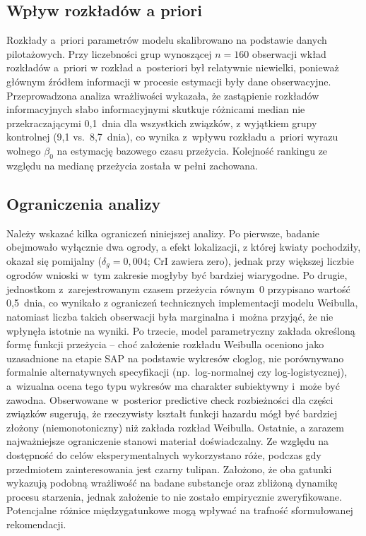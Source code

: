 \documentclass[12pt, a4paper]{article}
\begin{document}
\subsection{Wpływ rozkładów a priori}

Rozkłady a~priori parametrów modelu skalibrowano na podstawie danych pilotażowych. Przy liczebności grup wynoszącej $n = 160$ obserwacji wkład rozkładów a~priori w rozkład a~posteriori był relatywnie niewielki, ponieważ głównym źródłem informacji w procesie estymacji były dane obserwacyjne. Przeprowadzona analiza wrażliwości wykazała, że zastąpienie rozkładów informacyjnych słabo informacyjnymi skutkuje różnicami median nie przekraczającymi 0,1~dnia dla wszystkich związków, z wyjątkiem grupy kontrolnej (9,1 vs.~8,7~dnia), co wynika z~wpływu rozkładu a~priori wyrazu wolnego $\beta_0$ na estymację bazowego czasu przeżycia. Kolejność rankingu ze względu na medianę przeżycia została w pełni zachowana.

\subsection{Ograniczenia analizy}

Należy wskazać kilka ograniczeń niniejszej analizy. Po pierwsze, badanie obejmowało wyłącznie dwa ogrody, a efekt lokalizacji, z której kwiaty pochodziły, okazał się pomijalny ($\delta_g = 0{,}004$; CrI zawiera zero), jednak przy większej liczbie ogrodów wnioski w~tym zakresie mogłyby być bardziej wiarygodne. Po drugie, jednostkom z~zarejestrowanym czasem przeżycia równym~0 przypisano wartość 0,5~dnia, co wynikało z ograniczeń technicznych implementacji modelu Weibulla, natomiast liczba takich obserwacji była marginalna i~można przyjąć, że nie wpłynęła istotnie na wyniki. Po trzecie, model parametryczny zakłada określoną formę funkcji przeżycia -- choć założenie rozkładu Weibulla oceniono jako uzasadnione na etapie SAP na podstawie wykresów cloglog, nie porównywano formalnie alternatywnych specyfikacji (np.~log-normalnej czy log-logistycznej), a~wizualna ocena tego typu wykresów ma charakter subiektywny i~może być zawodna. Obserwowane w~posterior predictive check rozbieżności dla części związków sugerują, że rzeczywisty kształt funkcji hazardu mógł być bardziej złożony (niemonotoniczny) niż zakłada rozkład Weibulla. Ostatnie, a zarazem najważniejsze ograniczenie stanowi materiał doświadczalny. Ze względu na dostępność do celów eksperymentalnych wykorzystano róże, podczas gdy przedmiotem zainteresowania jest czarny tulipan. Założono, że oba gatunki wykazują podobną wrażliwość 
na badane substancje oraz zbliżoną dynamikę procesu starzenia, jednak 
założenie to nie zostało empirycznie zweryfikowane. Potencjalne różnice 
międzygatunkowe mogą wpływać na trafność sformułowanej rekomendacji.
\end{document}
